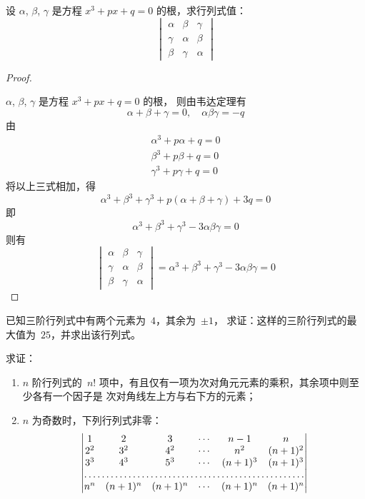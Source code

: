 \documentclass[twoside,openright]{book}
\begin{document}
\begin{CJK*}{UTF8}{}
\begin{quest}
\label{quest:106}
设\/ $\alpha$, $\beta$, $\gamma$ 是方程\/ $x^3+px+q=0$ 的根，求行列式值：
\[
\begin{vmatrix}
\alpha & \beta  & \gamma \\
\gamma & \alpha & \beta  \\
\beta  & \gamma & \alpha
\end{vmatrix}
\]
\end{quest}
\begin{proof}
$ $

$\alpha$, $\beta$, $\gamma$ 是方程\/ $x^3+px+q=0$ 的根，
则由韦达定理有
\[
\alpha + \beta + \gamma = 0,\quad \alpha \beta \gamma = -q
\]
由
\begin{align*}
\alpha^3 + p \alpha + q = 0 \\
\beta^3  + p \beta  + q = 0 \\
\gamma^3 + p \gamma + q = 0
\end{align*}
将以上三式相加，得
\[
\alpha^3 + \beta^3 + \gamma^3 + p(\alpha + \beta + \gamma) + 3 q = 0
\]
即
\[
\alpha^3 + \beta^3 + \gamma^3 -3 \alpha \beta \gamma = 0
\]
则有
\[
\begin{vmatrix}
\alpha & \beta  & \gamma \\
\gamma & \alpha & \beta  \\
\beta  & \gamma & \alpha
\end{vmatrix}
=
\alpha^3+\beta^3+\gamma^3-3\alpha \beta \gamma
=
0
\]
\end{proof}

\begin{quest}
\label{quest:107}
已知三阶行列式中有两个元素为\ $4$，其余为\ $\pm1$，
求证：这样的三阶行列式的最大值为\ $25$，并求出该行列式。
\end{quest}

\begin{quest}
\label{quest:108}
求证：
\begin{enumerate}
\item
$n$ 阶行列式的\ $n!$ 项中，有且仅有一项为次对角元元素的乘积，其余项中则至少各有一个因子是
次对角线左上方与右下方的元素；
\item
$n$ 为奇数时，下列行列式非零：
\[
\begin{vmatrix}
1               & 2               & 3               & \cdots & n-1       & n                 \\
2^2             & 3^2             & 4^2             & \cdots & n^2       & (n+1)^2           \\
3^3             & 4^3             & 5^3             & \cdots & (n+1)^3   & (n+1)^3           \\
\hdotsfor{6}                                                                                 \\
n^n             & (n+1)^n         & (n+1)^n         & \cdots & (n+1)^n   & (n+1)^n
\end{vmatrix}
\]
\end{enumerate}
\end{quest}


\end{CJK*}
\end{document}
